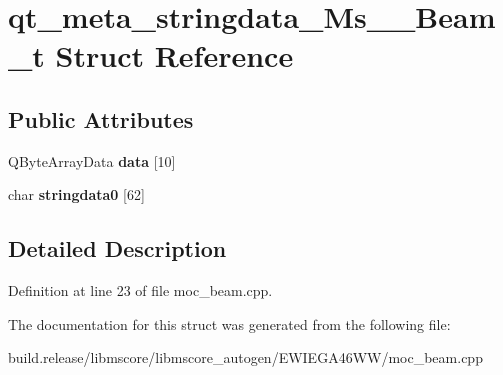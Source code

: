 \hypertarget{structqt__meta__stringdata___ms_____beam__t}{}\section{qt\+\_\+meta\+\_\+stringdata\+\_\+\+Ms\+\_\+\+\_\+\+Beam\+\_\+t Struct Reference}
\label{structqt__meta__stringdata___ms_____beam__t}
\subsection*{Public Attributes}
\begin{DoxyCompactItemize}
\item 
\mbox{\label{structqt__meta__stringdata___ms_____beam__t_aefbbbe724c15a6fd46a06acdca656c22}} 
Q\+Byte\+Array\+Data {\bfseries data} \mbox{[}10\mbox{]}
\item 
\mbox{\label{structqt__meta__stringdata___ms_____beam__t_aa5483884df1d1aaf7def1d18fedd795e}} 
char {\bfseries stringdata0} \mbox{[}62\mbox{]}
\end{DoxyCompactItemize}


\subsection{Detailed Description}


Definition at line 23 of file moc\+\_\+beam.\+cpp.



The documentation for this struct was generated from the following file\+:\begin{DoxyCompactItemize}
\item 
build.\+release/libmscore/libmscore\+\_\+autogen/\+E\+W\+I\+E\+G\+A46\+W\+W/moc\+\_\+beam.\+cpp\end{DoxyCompactItemize}
